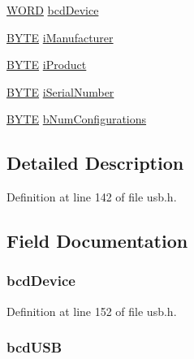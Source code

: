\begin{DoxyCompactItemize}
\item 
\hyperlink{type_8h_a197942eefa7db30960ae396d68339b97}{WORD} \hyperlink{struct___u_s_b___d_e_v_i_c_e___d_e_s_c_r_i_p_t_o_r_af88e09c836d1614d275fc607045e6d7f}{bcdDevice}
\item 
\hyperlink{type_8h_a4ae1dab0fb4b072a66584546209e7d58}{BYTE} \hyperlink{struct___u_s_b___d_e_v_i_c_e___d_e_s_c_r_i_p_t_o_r_a7ba414cda1ee046efab1b799bddc1547}{iManufacturer}
\item 
\hyperlink{type_8h_a4ae1dab0fb4b072a66584546209e7d58}{BYTE} \hyperlink{struct___u_s_b___d_e_v_i_c_e___d_e_s_c_r_i_p_t_o_r_a48e208396415b774014fca5687260a85}{iProduct}
\item 
\hyperlink{type_8h_a4ae1dab0fb4b072a66584546209e7d58}{BYTE} \hyperlink{struct___u_s_b___d_e_v_i_c_e___d_e_s_c_r_i_p_t_o_r_a5b35b5444cd62332c2c66a08658c7b19}{iSerialNumber}
\item 
\hyperlink{type_8h_a4ae1dab0fb4b072a66584546209e7d58}{BYTE} \hyperlink{struct___u_s_b___d_e_v_i_c_e___d_e_s_c_r_i_p_t_o_r_a6170c2c859a226f8dae80b59903e7ca2}{bNumConfigurations}
\end{DoxyCompactItemize}


\subsection{Detailed Description}


Definition at line 142 of file usb.h.



\subsection{Field Documentation}
\hypertarget{struct___u_s_b___d_e_v_i_c_e___d_e_s_c_r_i_p_t_o_r_af88e09c836d1614d275fc607045e6d7f}{
\subsubsection[{bcdDevice}]{ {\bf bcdDevice}}}
\label{struct___u_s_b___d_e_v_i_c_e___d_e_s_c_r_i_p_t_o_r_af88e09c836d1614d275fc607045e6d7f}


Definition at line 152 of file usb.h.

\hypertarget{struct___u_s_b___d_e_v_i_c_e___d_e_s_c_r_i_p_t_o_r_a813490518a88d421eb8eceaf467eab9b}{
\subsubsection[{bcdUSB}]{ {\bf bcdUSB}}}
\label{struct___u_s_b___d_e_v_i_c_e___d_e_s_c_r_i_p_t_o_r_a813490518a88d421eb8eceaf467eab9b}



